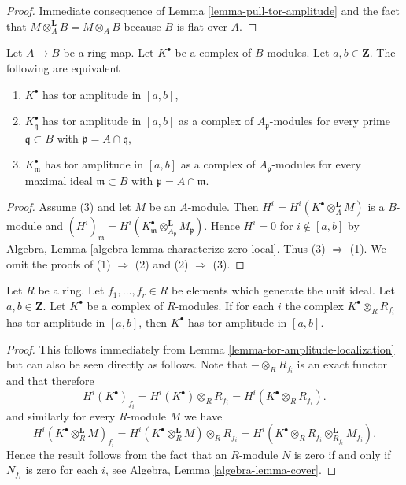 \begin{proof}
Immediate consequence of
Lemma \ref{lemma-pull-tor-amplitude}
and the fact that $M \otimes_A^{\mathbf{L}} B = M \otimes_A B$
because $B$ is flat over $A$.
\end{proof}

\begin{lemma}
\label{lemma-tor-amplitude-localization}
Let $A  \to B$ be a ring map. Let $K^\bullet$ be a complex of $B$-modules.
Let $a, b \in \mathbf{Z}$. The following are equivalent
\begin{enumerate}
\item $K^\bullet$ has tor amplitude in $[a, b]$,
\item $K^\bullet_\mathfrak q$ has tor amplitude in $[a, b]$ as a complex
of $A_\mathfrak p$-modules for every prime $\mathfrak q \subset B$
with $\mathfrak p = A \cap \mathfrak q$,
\item $K^\bullet_\mathfrak m$ has tor amplitude in $[a, b]$ as a complex
of $A_\mathfrak p$-modules for every maximal ideal $\mathfrak m \subset B$
with $\mathfrak p = A \cap \mathfrak m$.
\end{enumerate}
\end{lemma}

\begin{proof}
Assume (3) and let $M$ be an $A$-module. Then
$H^i = H^i(K^\bullet \otimes_A^\mathbf{L} M)$ is a $B$-module and
$(H^i)_\mathfrak m =
H^i(K^\bullet_\mathfrak m \otimes_{A_\mathfrak p}^\mathbf{L} M_\mathfrak p)$.
Hence $H^i = 0$ for $i \not \in [a, b]$ by
Algebra, Lemma \ref{algebra-lemma-characterize-zero-local}. Thus
(3) $\Rightarrow$ (1). We omit the proofs of (1) $\Rightarrow$ (2)
and (2) $\Rightarrow$ (3).
\end{proof}

\begin{lemma}
\label{lemma-glue-tor-amplitude}
Let $R$ be a ring. Let $f_1, \ldots, f_r \in R$ be elements which
generate the unit ideal. Let $a, b \in \mathbf{Z}$. Let $K^\bullet$
be a complex of $R$-modules. If for each $i$ the complex
$K^\bullet \otimes_R R_{f_i}$ has tor amplitude in $[a, b]$,
then $K^\bullet$ has tor amplitude in $[a, b]$.
\end{lemma}

\begin{proof}
This follows immediately from Lemma \ref{lemma-tor-amplitude-localization}
but can also be seen directly as follows.
Note that $- \otimes_R R_{f_i}$ is an exact functor and that therefore
$$
H^i(K^\bullet)_{f_i} =
H^i(K^\bullet) \otimes_R R_{f_i} = H^i(K^\bullet \otimes_R R_{f_i}).
$$
and similarly for every $R$-module $M$ we have
$$
H^i(K^\bullet \otimes_R^{\mathbf{L}} M)_{f_i} =
H^i(K^\bullet \otimes_R^{\mathbf{L}} M) \otimes_R R_{f_i} =
H^i(K^\bullet \otimes_R R_{f_i} \otimes_{R_{f_i}}^{\mathbf{L}} M_{f_i}).
$$
Hence the result follows from the fact that an $R$-module $N$
is zero if and only if $N_{f_i}$ is zero for each $i$, see
Algebra, Lemma \ref{algebra-lemma-cover}.
\end{proof}

